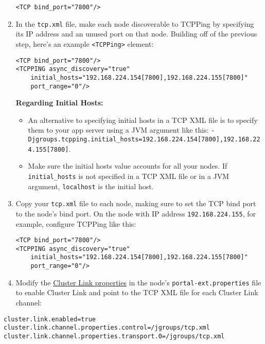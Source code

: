 \begin{enumerate}
\begin{verbatim}
<TCP bind_port="7800"/>
\end{verbatim}
\item
  In the \texttt{tcp.xml} file, make each node discoverable to TCPPing
  by specifying its IP address and an unused port on that node. Building
  off of the previous step, here's an example
  \texttt{\textless{}TCPPing\textgreater{}} element:

\begin{verbatim}
<TCP bind_port="7800"/>
<TCPPING async_discovery="true"
    initial_hosts="192.168.224.154[7800],192.168.224.155[7800]"
    port_range="0"/>
\end{verbatim}

  \textbf{Regarding Initial Hosts:}

  \begin{itemize}
  \tightlist
  \item
    An alternative to specifying initial hosts in a TCP XML file is to
    specify them to your app server using a JVM argument like this:
    \texttt{-Djgroups.tcpping.initial\_hosts=192.168.224.154{[}7800{]},192.168.224.155{[}7800{]}}.
  \item
    Make sure the initial hosts value accounts for all your nodes. If
    \texttt{initial\_hosts} is not specified in a TCP XML file or in a
    JVM argument, \texttt{localhost} is the initial host.
  \end{itemize}
\item
  Copy your \texttt{tcp.xml} file to each node, making sure to set the
  TCP bind port to the node's bind port. On the node with IP address
  \texttt{192.168.224.155}, for example, configure TCPPing like this:

\begin{verbatim}
<TCP bind_port="7800"/>
<TCPPING async_discovery="true"
    initial_hosts="192.168.224.154[7800],192.168.224.155[7800]"
    port_range="0"/>
\end{verbatim}
\item
  Modify the
  \href{https://docs.liferay.com/portal/7.2-latest/propertiesdoc/portal.properties.html\#Cluster\%20Link}{Cluster
  Link properties} in the node's \texttt{portal-ext.properties} file to
  enable Cluster Link and point to the TCP XML file for each Cluster
  Link channel:
\end{enumerate}

\begin{verbatim}
cluster.link.enabled=true
cluster.link.channel.properties.control=/jgroups/tcp.xml
cluster.link.channel.properties.transport.0=/jgroups/tcp.xml
\end{verbatim}


